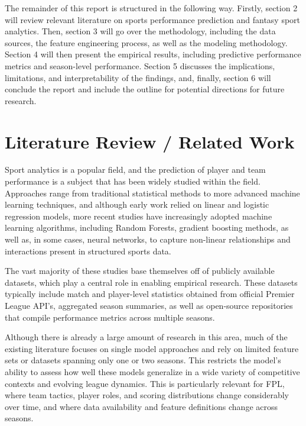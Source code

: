 \documentclass[11pt,a4paper]{article}
\begin{document}
The remainder of this report is structured in the following way. Firstly, section 2 will review relevant literature on sports performance prediction and fantasy sport analytics. Then, section 3 will go over the methodology, including the data sources, the feature engineering process, as well as the modeling methodology. Section 4 will then present the empirical results, including predictive performance metrics and season-level performance. Section 5 discusses the implications, limitations, and interpretability of the findings, and, finally, section 6 will conclude the report and include the outline for potential directions for future research.   

\section{Literature Review / Related Work}
\label{sec:literature}

Sport analytics is a popular field, and the prediction of player and team performance is a subject that has been widely studied within the field. Approaches range from traditional statistical methods to more advanced machine learning techniques, and although early work relied on linear and logistic regression models, more recent studies have increasingly adopted machine learning algorithms, including Random Forests, gradient boosting methods, as well as, in some cases, neural networks, to capture non-linear relationships and interactions present in structured sports data.

The vast majority of these studies base themselves off of publicly available datasets, which play a central role in enabling empirical research. These datasets typically include match and player-level statistics obtained from official Premier League API’s, aggregated season summaries, as well as open-source repositories that compile performance metrics across multiple seasons. 

Although there is already a large amount of research in this area, much of the existing literature focuses on single model approaches and rely on limited feature sets or datasets spanning only one or two seasons. This restricts the model’s ability to assess how well these models generalize in a wide variety of competitive contexts and evolving league dynamics. This is particularly relevant for FPL, where team tactics, player roles, and scoring distributions change considerably over time, and where data availability and feature definitions change across seasons. 
\end{document}
